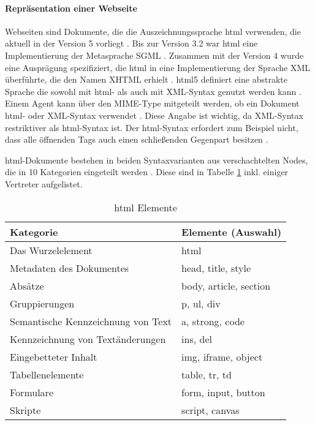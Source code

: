         \paragraph*{Repräsentation einer Webseite}
        Webseiten sind Dokumente, die die Auszeichnungssprache \gls{html} verwenden,
        die aktuell in der Version 5 vorliegt \cite{w3c:html5}.
        Bis zur Version 3.2 war \gls{html} eine Implementierung der Metasprache SGML \cite[Kapitel 3]{w3c:html401}.
        Zusammen mit der Version 4 wurde eine Ausprägung spezifiziert,
        die \gls{html} in eine Implementierung der Sprache XML überführte,
        die den Namen XHTML erhielt \cite{w3c:xhtml}.
        \gls{html}5 definiert eine abstrakte Sprache
        die sowohl mit \gls{html}- als auch mit XML-Syntax genutzt werden kann
        \cite[Kapitel 1.6]{w3c:html5}.
        Einem Agent kann über den MIME-Type mitgeteilt werden,
        ob ein Dokument \gls{html}- oder XML-Syntax verwendet \cite[Kapitel 1.6]{w3c:html5}.
        Diese Angabe ist wichtig, da XML-Syntax restriktiver als \gls{html}-Syntax ist.
        Der \gls{html}-Syntax erfordert zum Beispiel nicht,
        dass alle öffnenden Tags auch einen schließenden Gegenpart besitzen
        \cite[Kapitel 3.2.3]{w3c:html5}.
        
        \gls{html}-Dokumente bestehen in beiden Syntaxvarianten aus verschachtelten
        Nodes, die in 10 Kategorien eingeteilt werden \cite[Kapitel 4]{w3c:html5}.
        Diese sind in Tabelle \ref{table:htmlElements} inkl. einiger Vertreter aufgelistet.

        \begin{table}[h]
            \centering
            \begin{tabular}{|l|l|}
            \hline
            \textbf{Kategorie} & \textbf{Elemente (Auswahl)} \\
            \hline
            Das Wurzelelement & html \\
            \hline
            Metadaten des Dokumentes & head, title, style \\
            \hline
            Absätze & body, article, section \\
            \hline
            Gruppierungen & p, ul, div \\
            \hline
            Semantische Kennzeichnung von Text & a, strong, code \\
            \hline
            Kennzeichnung von Textänderungen & ins, del \\
            \hline
            Eingebetteter Inhalt & img, iframe, object \\
            \hline
            Tabellenelemente & table, tr, td \\
            \hline
            Formulare & form, input, button \\
            \hline
            Skripte & script, canvas \\
            \hline
            \end{tabular}
            \caption{\gls{html} Elemente}
            \label{table:htmlElements}
        \end{table}

